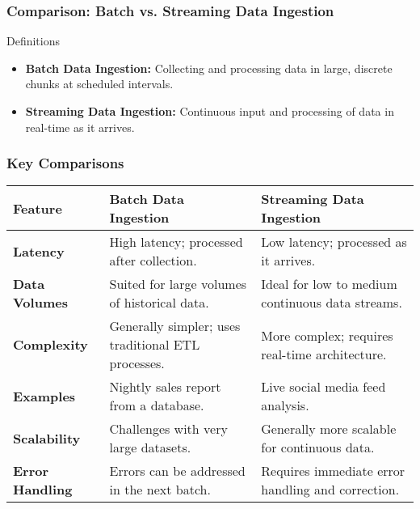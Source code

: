 \documentclass[aspectratio=169]{beamer}
\begin{document}
\begin{frame}[fragile]
    \frametitle{Comparison: Batch vs. Streaming Data Ingestion}
    \begin{block}{Definitions}
        \begin{itemize}
            \item \textbf{Batch Data Ingestion:} Collecting and processing data in large, discrete chunks at scheduled intervals.
            \item \textbf{Streaming Data Ingestion:} Continuous input and processing of data in real-time as it arrives.
        \end{itemize}
    \end{block}
\end{frame}

\begin{frame}[fragile]
    \frametitle{Key Comparisons}
    \begin{table}[]
        \centering
        \begin{tabular}{|l|l|l|}
            \hline
            \textbf{Feature}                & \textbf{Batch Data Ingestion}                          & \textbf{Streaming Data Ingestion}                       \\ \hline
            \textbf{Latency}                & High latency; processed after collection.              & Low latency; processed as it arrives.                   \\ \hline
            \textbf{Data Volumes}           & Suited for large volumes of historical data.           & Ideal for low to medium continuous data streams.        \\ \hline
            \textbf{Complexity}             & Generally simpler; uses traditional ETL processes.    & More complex; requires real-time architecture.           \\ \hline
            \textbf{Examples}               & Nightly sales report from a database.                  & Live social media feed analysis.                         \\ \hline
            \textbf{Scalability}            & Challenges with very large datasets.                   & Generally more scalable for continuous data.            \\ \hline
            \textbf{Error Handling}         & Errors can be addressed in the next batch.             & Requires immediate error handling and correction.        \\ \hline
        \end{tabular}
    \end{table}
\end{frame}
\end{document}
